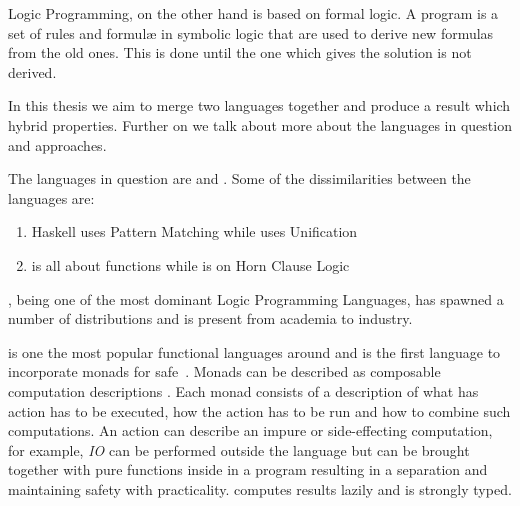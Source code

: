 \documentclass[thesis-solanki.tex]{subfiles}
\begin{document}
Logic Programming, \cite{spivey1995introduction} on the other hand is based on formal logic.
A program is a set of rules and formul\ae{} in symbolic logic that are used to derive new formulas from the old
ones.
This is done until the one which gives the solution is not derived.


In this thesis we aim to merge two languages
together and produce a result which   hybrid
properties.
Further on we talk about more about the languages in question and approaches\xxx{\Verb[showspaces]! !}.

The languages in question are  and .
Some of the dissimilarities between the languages are:
\begin{enumerate}
\item { Haskell} uses Pattern Matching while  uses Unification

\item {} is all about functions while  is on Horn Clause Logic
\end{enumerate} 

 \cite{wikiprolog}, being one of the most dominant Logic Programming
Languages, has  
spawned a number of distributions and is present from academia to industry.  

 is one the most popular \cite{website:langpop} functional languages around and is the 
first language to incorporate monads \cite{wadler1992comprehending} for safe \,. Monads can be 
described as composable computation descriptions \cite{website:monadshaskellorg} . Each monad consists of a 
description of what has action has to be executed, how the action has to be run and how to combine such 
computations. An action can describe an impure or side-effecting computation, for example, \textit{IO} can be 
performed outside the language but can be brought together with pure functions inside in a program resulting in a 
separation and maintaining safety with practicality.  computes results lazily and is strongly 
typed. 
\end{document}
